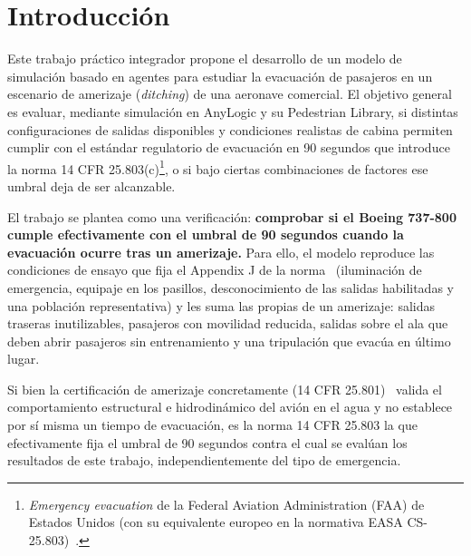 \documentclass[a4paper, 11pt]{article}
\begin{document}
\newpage
\section{Introducci\'on}

Este trabajo pr\'actico integrador propone el desarrollo de un modelo de
simulaci\'on basado en agentes para estudiar la evacuaci\'on de pasajeros en un
escenario de amerizaje (\textit{ditching}) de una aeronave comercial. El objetivo
general es evaluar, mediante simulaci\'on en AnyLogic y su Pedestrian Library, si
distintas configuraciones de salidas disponibles y condiciones realistas de cabina
permiten cumplir con el est\'andar regulatorio de evacuaci\'on en 90 segundos que
introduce la norma 14 CFR 25.803(c)\footnote{\textit{Emergency evacuation} de la
Federal Aviation Administration (FAA) de Estados Unidos (con su equivalente europeo
en la normativa EASA CS-25.803)~\cite{cfr25803}.}, o si bajo ciertas combinaciones
de factores ese umbral deja de ser alcanzable.

El trabajo se plantea como una verificaci\'on: \textbf{comprobar si el Boeing
737-800 cumple efectivamente con el umbral de 90 segundos cuando la evacuaci\'on
ocurre tras un amerizaje.} Para ello, el modelo reproduce las condiciones de ensayo
que fija el Appendix J de la norma~\cite{cfrAppJ} (iluminaci\'on de emergencia,
equipaje en los pasillos, desconocimiento de las salidas habilitadas y una
poblaci\'on representativa) y les suma las propias de un amerizaje: salidas traseras
inutilizables, pasajeros con movilidad reducida, salidas sobre el ala que deben
abrir pasajeros sin entrenamiento y una tripulaci\'on que evac\'ua en \'ultimo lugar.

Si bien la certificaci\'on de amerizaje concretamente (14 CFR
25.801)~\cite{cfr25801} valida el comportamiento estructural e hidrodin\'amico del
avi\'on en el agua y no establece por s\'i misma un tiempo de evacuaci\'on, es la
norma 14 CFR 25.803 la que efectivamente fija el umbral de 90 segundos contra el
cual se eval\'uan los resultados de este trabajo, independientemente del tipo de
emergencia.
\end{document}
